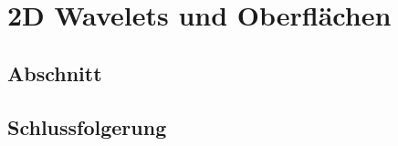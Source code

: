 %
%
%
\chapter{2D Wavelets und Oberflächen\label{chapter:thema}}
\begin{refsection}

\section{Abschnitt}

\section{Schlussfolgerung}

\printbibliography[heading=subbibliography]
\end{refsection}
